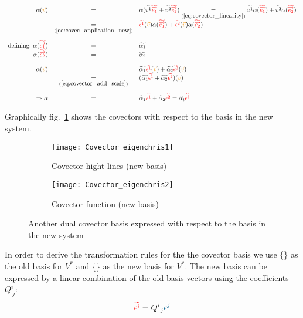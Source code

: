 \begin{equation}
    \label{eq:covector_with_respect_to_new_basis} 
    \begin{array}{rcl}
        \alpha(\hdv) & = &
        \alpha(\hdtvc{1}\hdbtv{1} + \hdtvc{2}\hdbtv{2})
        \underset{(\ref{eq:covector_linearity})}{=}
        \hdtvc{1}\alpha(\hdbtv{1}) + \hdtvc{2}\alpha(\hdbtv{2}) \\
        & \underset{(\ref{eq:covec_application_new})}{=} &
        \hdcbtvc{1}(\hdv)\alpha(\hdbtv{1}) + \hdcbtvc{2}(\hdv)\alpha(\hdbtv{2}) \\
        \noalign{\vskip10pt}
        \text{defining:}\ \alpha(\hdbtv{1}) & = & \widetilde{\alpha_1} \\
        \alpha(\hdbtv{2}) & = & \widetilde{\alpha_2} \\ 
        \noalign{\vskip10pt}
        \alpha(\hdv) & = &
        \widetilde{\alpha_1}\hdcbtvc{1}(\hdv) + \widetilde{\alpha_2}\hdcbtvc{2}(\hdv) \\
        & \underset{(\ref{eq:covector_add_scale})}{=} &
        (\widetilde{\alpha_1}\hdcbtvc{1} + \widetilde{\alpha_2}\hdcbtvc{2})(\hdv) \\
        \noalign{\vskip10pt}
        \Rightarrow \alpha & = & \widetilde{\alpha_1}\hdcbtvc{1} + 
        \widetilde{\alpha_2}\hdcbtvc{2} =
        \widetilde{\alpha_i}\hdcbtvc{i}
    \end{array}
\end{equation}


Graphically fig.~\ref{fig:covectors_new_system} shows the covectors with respect to the
basis in the new system.\\

\begin{figure}[h]
    \centering
    \begin{subfigure}[b]{0.5175\textwidth}
        \centering
        \texttt{[image: Covector\_eigenchris1]}
        \caption{Covector hight lines (new basis)}
    \end{subfigure}
    \hfill
    \begin{subfigure}[b]{0.45\textwidth}
        \centering
        \texttt{[image: Covector\_eigenchris2]}
        \caption{Covector function (new basis)}
    \end{subfigure}
    \caption{Another dual covector basis expressed with respect to the basis in the new
    system}
    \label{fig:covectors_new_system}
\end{figure}

In order to derive the transformation rules for the the covector basis we use
\{\} as the old basis for $V^*$ and \{\} as the new basis for $V^*$.
The new basis can be expressed by a linear combination of the old basis vectors using the
coefficients $Q^{i~}_{~j}$:
\begin{equation}
    \label{eq:covector_new_basis_as_linearcombination_in_old_basis}
    \hdcbtvc{i} = Q^{i~}_{~j}\hdcbvc{j}
\end{equation}

